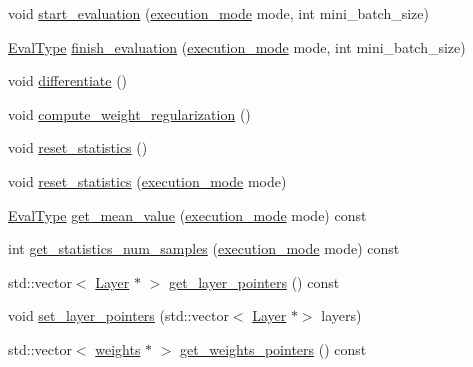 \begin{DoxyCompactItemize}
void \hyperlink{classlbann_1_1objective__function_a3edb6708894d31ec2a014c6eb8a61df2}{start\+\_\+evaluation} (\hyperlink{base_8hpp_a2781a159088df64ed7d47cc91c4dc0a8}{execution\+\_\+mode} mode, int mini\+\_\+batch\+\_\+size)
\item 
\hyperlink{base_8hpp_a3266f5ac18504bbadea983c109566867}{Eval\+Type} \hyperlink{classlbann_1_1objective__function_ad35ce9b7daa87d197d00b1762b691a02}{finish\+\_\+evaluation} (\hyperlink{base_8hpp_a2781a159088df64ed7d47cc91c4dc0a8}{execution\+\_\+mode} mode, int mini\+\_\+batch\+\_\+size)
\item 
void \hyperlink{classlbann_1_1objective__function_ae8b7314bdc12ba52d270b46a35acd138}{differentiate} ()
\item 
void \hyperlink{classlbann_1_1objective__function_a7b7f8869bf110846e971fef995db51e1}{compute\+\_\+weight\+\_\+regularization} ()
\item 
void \hyperlink{classlbann_1_1objective__function_acf7a6c67e7a45a1fd03684ca897d6324}{reset\+\_\+statistics} ()
\item 
void \hyperlink{classlbann_1_1objective__function_a3c564d26d6c75007ae95153cef3b8c02}{reset\+\_\+statistics} (\hyperlink{base_8hpp_a2781a159088df64ed7d47cc91c4dc0a8}{execution\+\_\+mode} mode)
\item 
\hyperlink{base_8hpp_a3266f5ac18504bbadea983c109566867}{Eval\+Type} \hyperlink{classlbann_1_1objective__function_a0aa271e497363e97ba3741292961d47d}{get\+\_\+mean\+\_\+value} (\hyperlink{base_8hpp_a2781a159088df64ed7d47cc91c4dc0a8}{execution\+\_\+mode} mode) const
\item 
int \hyperlink{classlbann_1_1objective__function_a19078ce481d321627adfe0151112602e}{get\+\_\+statistics\+\_\+num\+\_\+samples} (\hyperlink{base_8hpp_a2781a159088df64ed7d47cc91c4dc0a8}{execution\+\_\+mode} mode) const
\item 
std\+::vector$<$ \hyperlink{classlbann_1_1Layer}{Layer} $\ast$ $>$ \hyperlink{classlbann_1_1objective__function_a1055da2236a7faf79c5a2632f8dfc683}{get\+\_\+layer\+\_\+pointers} () const
\item 
void \hyperlink{classlbann_1_1objective__function_a0f934e078b55528dd0ec1ec8ad34c73b}{set\+\_\+layer\+\_\+pointers} (std\+::vector$<$ \hyperlink{classlbann_1_1Layer}{Layer} $\ast$$>$ layers)
\item 
std\+::vector$<$ \hyperlink{classlbann_1_1weights}{weights} $\ast$ $>$ \hyperlink{classlbann_1_1objective__function_a8e37f76e42f6f341ea3592001b3794e5}{get\+\_\+weights\+\_\+pointers} () const
\item 
$$
\end{DoxyCompactItemize}
